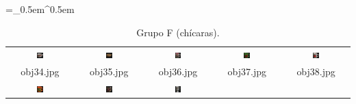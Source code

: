 \begin{table}[H]
  \centering
  \caption{Grupo F (chícaras).}
  \tabulinesep =_0.5em^0.5em
  \everyrow{\tabucline[0.4pt]-}
  \begin{tabu}{|ccccc|}
    \includegraphics[width=0.1\textwidth,height=0.1\textwidth]{imagens/coil_100/chicaras/obj10__0.png} &
    \includegraphics[width=0.1\textwidth,height=0.1\textwidth]{imagens/coil_100/chicaras/obj11__0.png} &
    \includegraphics[width=0.1\textwidth,height=0.1\textwidth]{imagens/coil_100/chicaras/obj16__0.png} &
    \includegraphics[width=0.1\textwidth,height=0.1\textwidth]{imagens/coil_100/chicaras/obj43__0.png} &
    \includegraphics[width=0.1\textwidth,height=0.1\textwidth]{imagens/coil_100/chicaras/obj45__0.png}
    \\
    \scriptsize{obj34.jpg} & \scriptsize{obj35.jpg} & \scriptsize{obj36.jpg} &
    \scriptsize{obj37.jpg} & \scriptsize{obj38.jpg}
    \\
    \includegraphics[width=0.1\textwidth,height=0.1\textwidth]{imagens/coil_100/chicaras/obj59__0.png} &
    \includegraphics[width=0.1\textwidth,height=0.1\textwidth]{imagens/coil_100/chicaras/obj81__0.png} &
    \includegraphics[width=0.1\textwidth,height=0.1\textwidth]{imagens/coil_100/chicaras/obj89__0.png} &

\end{tabu}
\end{table}
